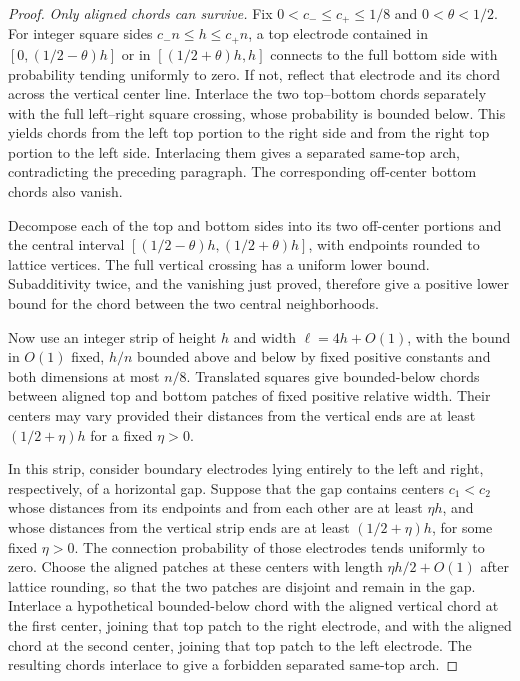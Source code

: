 \begin{proof}
\smallskip\noindent
\emph{Only aligned chords can survive.}
Fix $0<c_-\le c_+\le1/8$ and $0<\theta<1/2$. For integer square sides
$c_-n\le h\le c_+n$, a top electrode contained in
$[0,(1/2-\theta)h]$ or in $[(1/2+\theta)h,h]$ connects to the full
bottom side with probability tending uniformly to zero.
If not, reflect that electrode and its chord across the vertical center
line.  Interlace the two top--bottom chords separately with the
full left--right square crossing, whose probability is bounded below.
This yields chords from the left top portion to the right side and
from the right top portion to the left side.  Interlacing them gives
a separated same-top arch, contradicting the preceding paragraph.
The corresponding off-center bottom chords also vanish.

Decompose each of the top and bottom sides into its two off-center
portions and the central interval
$[(1/2-\theta)h,(1/2+\theta)h]$, with endpoints rounded to lattice
vertices. The full
vertical crossing has a uniform lower bound.  Subadditivity twice,
and the vanishing just proved, therefore give a positive lower bound
for the chord between the two central neighborhoods.

Now use an integer strip of height $h$ and width $\ell=4h+O(1)$, with
the bound in $O(1)$ fixed,
$h/n$ bounded above and below by fixed positive constants and both
dimensions at most $n/8$. Translated squares give bounded-below chords
between aligned top and bottom patches of fixed positive relative width.
Their centers may vary provided their distances from the vertical ends
are at least $(1/2+\eta)h$ for a fixed $\eta>0$.

In this strip, consider boundary electrodes lying entirely to the left
and right, respectively, of a horizontal gap. Suppose that the gap
contains centers $c_1<c_2$ whose distances from its endpoints and from
each other are at least $\eta h$, and whose distances from the vertical
strip ends are at least $(1/2+\eta)h$, for some fixed $\eta>0$.
The connection probability of those electrodes tends uniformly to zero.
Choose the aligned patches at these centers with length
$\eta h/2+O(1)$ after lattice rounding, so that the two patches are disjoint and
remain in the gap. Interlace a hypothetical
bounded-below chord with the aligned vertical chord at the first
center, joining that top patch to the right electrode, and with the
aligned chord at the second center, joining that top patch to the left
electrode.  The resulting chords interlace to give a forbidden
separated same-top arch.


\end{proof}
